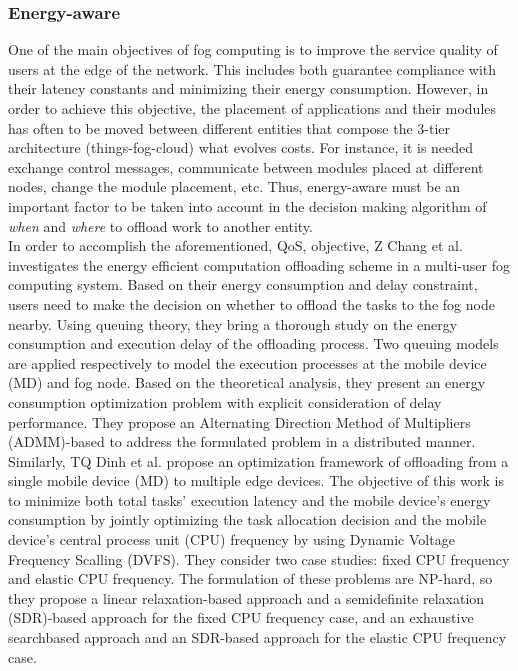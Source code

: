 \subsubsection{Energy-aware}
One of the main objectives of fog computing is to improve the service quality of users at the edge of the network. This includes both guarantee compliance with their latency constants and minimizing their energy consumption. However, in order to achieve this objective, the placement of applications and their modules has often to be moved between different entities that compose the 3-tier architecture (things-fog-cloud) what evolves costs. For instance, it is needed exchange control messages, communicate between modules placed at different nodes, change the module placement, etc. Thus, energy-aware must be an important factor to be taken into account in the decision making algorithm of \textit{when} and \textit{where} to offload work to another entity.\\
\noindent\tab In order to accomplish the aforementioned, QoS, objective, Z Chang et al. \cite{chang2017energy} investigates the energy efficient computation offloading scheme in a multi-user fog computing system. Based on their energy consumption and delay constraint, users need to make the decision on whether to offload the tasks to the fog node nearby. Using queuing theory, they bring a thorough study on the energy consumption and execution delay of the offloading process. Two queuing models are applied respectively to model the execution processes at the mobile device (MD) and fog node. Based on the theoretical analysis, they present an energy consumption optimization problem with explicit consideration of delay performance. They propose an Alternating Direction Method of Multipliers (ADMM)-based to address the formulated problem in a distributed manner. Similarly, TQ Dinh et al. \cite{dinh2017offloading} propose an optimization framework of offloading from a single mobile device (MD) to multiple edge devices. The objective of this work is to minimize both total tasks’ execution latency and the mobile device’s energy consumption by jointly optimizing the task allocation decision and the mobile device’s central process unit (CPU) frequency by using Dynamic Voltage Frequency Scalling (DVFS). They consider two case studies: fixed CPU frequency and elastic CPU frequency. The formulation of these problems are NP-hard, so they propose a linear relaxation-based approach and a semidefinite relaxation (SDR)-based approach for the fixed CPU frequency case, and an exhaustive searchbased approach and an SDR-based approach for the elastic CPU frequency case.\\
